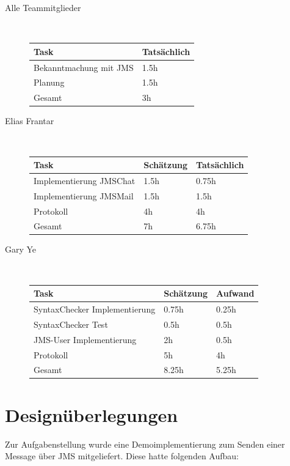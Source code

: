 \documentclass[11pt, a4paper]{article}
\begin{document}
\begin{description}
\item[Alle Teammitglieder] \hfill \\
  \begin{tabular} {| l | l |}
    \hline
    Task & Tatsächlich \\ \hline
    Bekanntmachung mit JMS & 1.5h \\ \hline
    Planung & 1.5h \\ \hline
    \hline
    Gesamt & 3h \\ \hline
  \end{tabular}

\item[Elias Frantar] \hfill \\

  \begin{tabular} {| l | l | l |}
    \hline
    Task & Schätzung & Tatsächlich \\ \hline
    Implementierung JMSChat & 1.5h & 0.75h \\ \hline
    Implementierung JMSMail & 1.5h & 1.5h \\ \hline
    Protokoll & 4h & 4h \\ \hline
    \hline
    Gesamt & 7h & 6.75h \\ \hline
  \end{tabular}

\item[Gary Ye] \hfill \\
    \begin{tabular} {| l | l | l |}
      \hline
      Task & Schätzung & Aufwand \\ \hline
      SyntaxChecker Implementierung & 0.75h & 0.25h \\ \hline
      SyntaxChecker Test & 0.5h & 0.5h \\ \hline
      JMS-User Implementierung & 2h & 0.5h \\ \hline
      Protokoll & 5h & 4h \\ \hline
      \hline
      Gesamt & 8.25h & 5.25h \\ \hline
    \end{tabular}
\end{description}

\newpage

\section{Designüberlegungen}
Zur Aufgabenstellung wurde eine Demoimplementierung zum Senden einer Message über JMS mitgeliefert. Diese hatte folgenden Aufbau:
\end{document}
